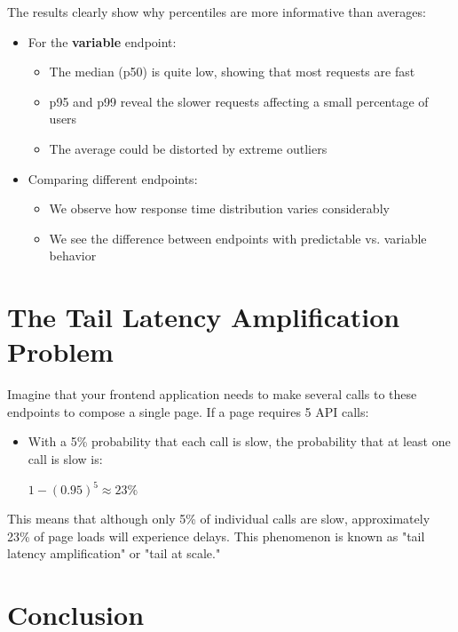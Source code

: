 \documentclass[12pt,letterpaper]{article}
\begin{document}
The results clearly show why percentiles are more informative than averages:

\begin{itemize}
    \item For the \textbf{\textcolor{accentColor}{variable}} endpoint:
        \begin{itemize}
            \item The median (p50) is quite low, showing that most requests are fast
            \item p95 and p99 reveal the slower requests affecting a small percentage of users
            \item The average could be distorted by extreme outliers
        \end{itemize}
    \item Comparing different endpoints:
        \begin{itemize}
            \item We observe how response time distribution varies considerably
            \item We see the difference between endpoints with predictable vs. variable behavior
        \end{itemize}
\end{itemize}

\section{The Tail Latency Amplification Problem}

Imagine that your frontend application needs to make several calls to these endpoints to compose a single page. If a page requires 5 API calls:

\begin{itemize}
    \item With a 5\% probability that each call is slow, the probability that at least one call is slow is:
    \begin{center}
    $1 - (0.95)^5 \approx 23\%$
    \end{center}
\end{itemize}

This means that although only 5\% of individual calls are slow, approximately 23\% of page loads will experience delays. This phenomenon is known as "tail latency amplification" or "tail at scale."

\section{Conclusion}
\end{document}
